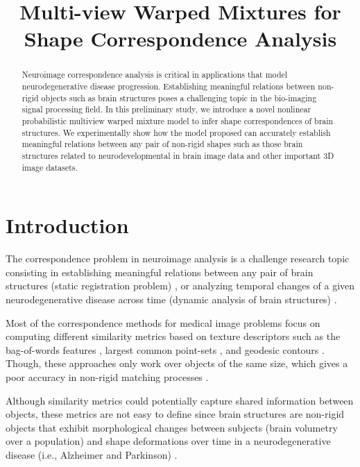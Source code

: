 \documentclass[]{article}
\title{Multi-view Warped Mixtures for Shape Correspondence Analysis}
\begin{document}
\maketitle

\begin{abstract}
Neuroimage correspondence analysis is critical in applications that model neurodegenerative disease progression. Establishing meaningful relations between non-rigid objects such as brain structures poses a challenging topic in the bio-imaging signal processing field.  In this preliminary study, we introduce a novel nonlinear probabilistic multiview warped mixture model to infer shape correspondences of brain structures. We experimentally show how the model proposed can accurately establish meaningful relations between any pair of non-rigid shapes such as those brain structures related to neurodevelopmental in brain image data and other important 3D image datasets.
\end{abstract}

\section{Introduction}


The correspondence problem in neuroimage analysis is a challenge research topic consisting in establishing
meaningful relations between any pair of brain structures (static registration problem) \cite{LinCW14}, or analyzing
temporal changes of a given neurodegenerative disease across time (dynamic analysis of brain structures)
\cite{durrleman2014}. 

Most of the correspondence methods for medical image problems focus on computing different similarity metrics based on
texture descriptors such as the bag-of-words features \cite{Bronstein11}, largest common point-sets \cite{Aiger08}, and
geodesic contours \cite{LiangSW15}. Though, these approaches only work over objects of the same size, which gives a poor accuracy in non-rigid matching processes \cite{Brunton14}.

Although similarity metrics could potentially capture shared information between objects, these metrics
are not easy to define \cite{CortesS15} since brain structures are non-rigid
objects that exhibit morphological changes between subjects (brain volumetry over a population) and shape deformations
over time in a neurodegenerative disease (i.e., Alzheimer and Parkinson) \cite{Cosa13}.
\end{document}
